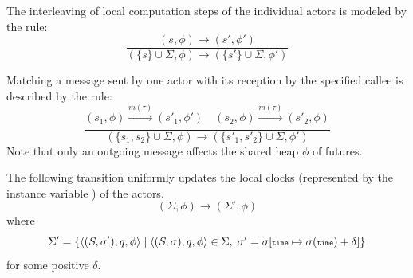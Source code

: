The interleaving of local computation steps of the individual actors is
modeled by the rule:
$$
\frac{(s, \phi) \rightarrow (s', \phi')}
{(\{s\}\cup\Sigma, \phi)\rightarrow (\{s'\}\cup\Sigma, \phi')}
$$

Matching a  message sent by one actor with its  reception by  the specified callee
is described by the rule:
$$
\frac
{(s_1, \phi) \xrightarrow[]{m(\tau)} (s'_1, \phi')\quad (s_2, \phi) \xrightarrow[]{m(\tau)} (s'_2, \phi) }
{(\{s_1,s_2\}\cup\Sigma, \phi) \rightarrow (\{s'_1 , s'_2 \} \cup \Sigma, \phi')}
$$
Note that only an outgoing message affects the shared heap $\phi$ of futures.

The following transition uniformly updates the local clocks (represented by the instance variable )
of the actors.
$$
(\Sigma,\phi)\rightarrow (\Sigma',\phi)
$$
where
$$
\Sigma'=\{\langle (S,\sigma'), q, \phi\rangle\mid
\langle (S,\sigma), q, \phi\rangle\in \Sigma,\; \sigma'=\sigma [{\scriptsize\texttt{time}}\mapsto \sigma({\scriptsize\texttt{time}})+\delta]\}
$$
for some positive $\delta$.


% 
% 




